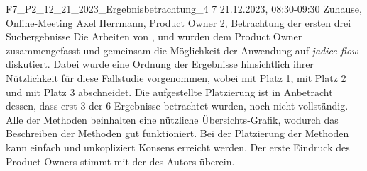 \fieldnote
{F7\_P2\_12\_21\_2023\_Ergebnisbetrachtung\_4}
{7}
{21.12.2023, 08:30-09:30}
{Zuhause, Online-Meeting}
{Axel Herrmann, Product Owner}
{2, Betrachtung der ersten drei Suchergebnisse}
{
	Die Arbeiten von ,  und  wurden dem Product Owner zusammengefasst und gemeinsam die Möglichkeit der Anwendung auf \emph{jadice flow} diskutiert.
  Dabei wurde eine Ordnung der Ergebnisse hinsichtlich ihrer Nützlichkeit für diese Fallstudie vorgenommen, wobei  mit Platz 1,  mit Platz 2 und  mit Platz 3 abschneidet.
}
{
	Die aufgestellte Platzierung ist in Anbetracht dessen, dass erst 3 der 6 Ergebnisse betrachtet wurden, noch nicht vollständig.
}
{
  Alle der Methoden beinhalten eine nützliche Übersichts-Grafik, wodurch das Beschreiben der Methoden gut funktioniert.
  Bei der Platzierung der Methoden kann einfach und unkopliziert Konsens erreicht werden.
}
{}
{
	Der erste Eindruck des Product Owners stimmt mit der des Autors überein.
}
